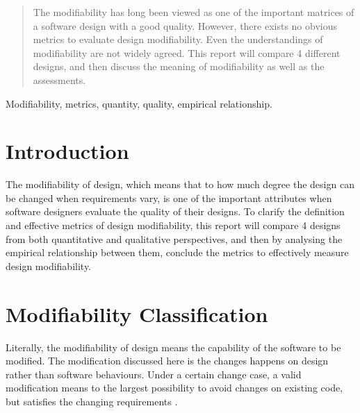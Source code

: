 \documentclass[conference]{IEEEtran}
\begin{document}
	
	
	
	\maketitle
	
	\begin{abstract}
	The modifiability has long been viewed as one of the important matrices of a software design with a good quality. However, there exists no obvious metrics to evaluate design modifiability. Even the understandings of modifiability are not widely agreed. This report will compare 4 different designs, and then discuss the meaning of modifiability as well as the assessments.  
	\end{abstract}
	
	\begin{IEEEkeywords}
	Modifiability, metrics, quantity, quality, empirical relationship.
	\end{IEEEkeywords}
	
	
	
	
	\IEEEpeerreviewmaketitle
	
	
	
	\section{Introduction}
	The modifiability of design, which means that to how much degree the design can be changed when requirements vary, is one of the important attributes when software designers evaluate the quality of their designs. To clarify the definition and effective metrics of design modifiability, this report will compare 4 designs from both quantitative and qualitative perspectives, and then by analysing the empirical relationship between them, conclude the metrics to effectively measure design modifiability.
	
	\section{Modifiability Classification}
	Literally, the modifiability of design means the capability of the software to be modified. The modification discussed here is the changes happens on design rather than software behaviours. Under a certain change case, a valid modification means to the largest possibility to avoid changes on existing code, but satisfies the changing requirements \cite{2}.
	
\end{document}
